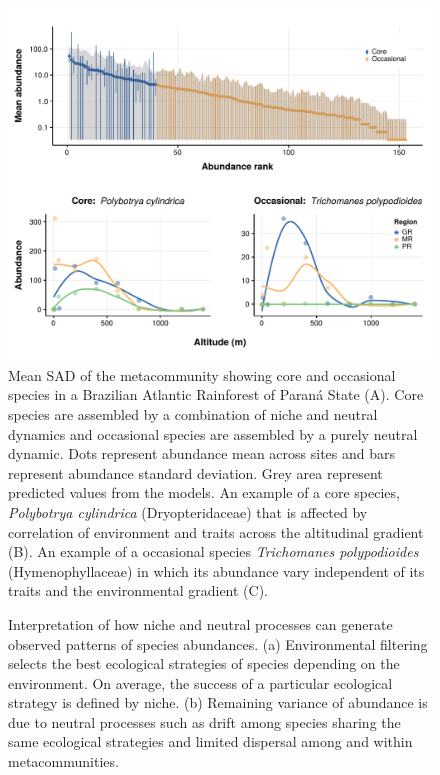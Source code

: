 \documentclass[12pt]{article}
\begin{document}
\begin{figure}[!h]
 \begin{center}
\includegraphics[scale=.75]{./fig/rad_mettacomunity.pdf}
\end{center}
\caption{Mean SAD of the metacommunity showing core and occasional species in a Brazilian Atlantic Rainforest of Paran\'a State (A). Core species are assembled by a combination of niche and neutral dynamics and occasional species are assembled by a purely neutral dynamic. Dots represent abundance mean across sites and bars represent abundance standard deviation. Grey area represent predicted values from the models. An example of a core species, \emph{Polybotrya cylindrica} (Dryopteridaceae) that is affected by correlation of environment and traits across the altitudinal gradient (B). An example of a occasional species \emph{Trichomanes polypodioides} (Hymenophyllaceae) in which its abundance vary independent of its traits and the environmental gradient (C). \label{rad}}
\end{figure}

\begin{figure}[!ht]
 \begin{center}
\end{center}
\caption{Interpretation of how niche and neutral processes can generate observed patterns of species abundances. (a) Environmental filtering selects the best ecological strategies of species depending on the environment. On average, the success of a particular ecological strategy is defined by niche. (b) Remaining variance of abundance is due to neutral processes such as drift among species sharing the same ecological strategies and limited dispersal among and within metacommunities.} \label{final}
\end{figure}

\end{document}
